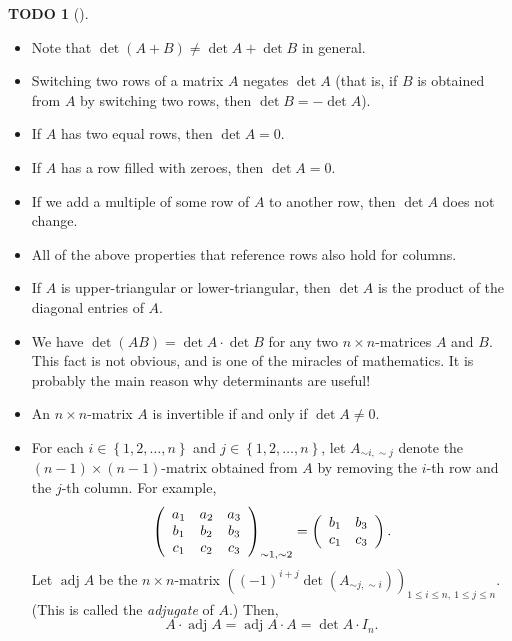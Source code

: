 \documentclass[numbers=enddot,12pt,final,onecolumn,notitlepage]{scrartcl}%
\theoremstyle{definition}
\newtheorem{quest}[theo]{TODO}
\newenvironment{todo}[1][]
{\begin{quest}[#1]\begin{leftbar}}
{\end{leftbar}\end{quest}}
\begin{document}
\begin{todo}
\begin{itemize}
\item Note that $\det\left(  A+B\right)  \neq\det A+\det B$ in general.

\item Switching two rows of a matrix $A$ negates $\det A$ (that is, if $B$ is
obtained from $A$ by switching two rows, then $\det B=-\det A$).

\item If $A$ has two equal rows, then $\det A=0$.

\item If $A$ has a row filled with zeroes, then $\det A=0$.

\item If we add a multiple of some row of $A$ to another row, then $\det A$
does not change.

\item All of the above properties that reference rows also hold for columns.

\item If $A$ is upper-triangular or lower-triangular, then $\det A$ is the
product of the diagonal entries of $A$.

\item We have $\det\left(  AB\right)  =\det A\cdot\det B$ for any two $n\times
n$-matrices $A$ and $B$. This fact is not obvious, and is one of the miracles
of mathematics. It is probably the main reason why determinants are useful!

\item An $n\times n$-matrix $A$ is invertible if and only if $\det A\neq0$.

\item For each $i\in\left\{  1,2,\ldots,n\right\}  $ and $j\in\left\{
1,2,\ldots,n\right\}  $, let $A_{\sim i,\sim j}$ denote the $\left(
n-1\right)  \times\left(  n-1\right)  $-matrix obtained from $A$ by removing
the $i$-th row and the $j$-th column. For example,%
\[
\left(
\begin{array}
[c]{ccc}%
a_{1} & a_{2} & a_{3}\\
b_{1} & b_{2} & b_{3}\\
c_{1} & c_{2} & c_{3}%
\end{array}
\right)  _{\sim1,\sim2}=\left(
\begin{array}
[c]{cc}%
b_{1} & b_{3}\\
c_{1} & c_{3}%
\end{array}
\right)  .
\]
Let $\operatorname*{adj}A$ be the $n\times n$-matrix $\left(  \left(
-1\right)  ^{i+j}\det\left(  A_{\sim j,\sim i}\right)  \right)  _{1\leq i\leq
n,\ 1\leq j\leq n}$. (This is called the \textit{adjugate} of $A$.) Then,%
\[
A\cdot\operatorname*{adj}A=\operatorname*{adj}A\cdot A=\det A\cdot I_{n}.
\]



\end{itemize}
\end{todo}
\end{document}
